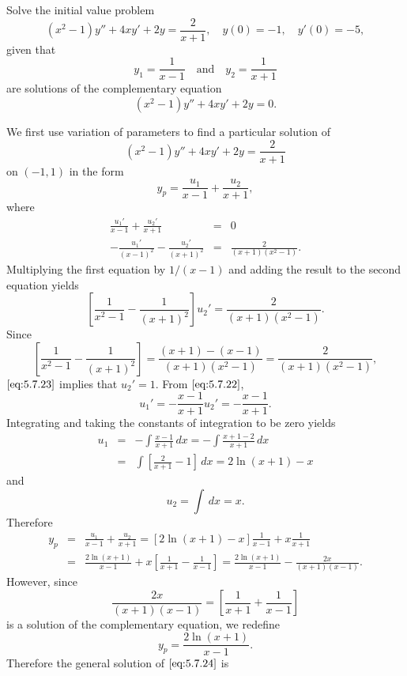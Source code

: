 \documentclass{ximera}
\begin{document}
 
\begin{example}\label{example:5.7.4}
Solve the initial value problem
\begin{equation} \label{eq:5.7.21}
(x^2-1)y''+4xy'+2y=\frac{2}{x+1}, \quad  y(0)=-1,\quad y'(0)=-5,
\end{equation}
 given that
$$
y_1=\frac{1}{x-1}\quad\mbox{and}\quad y_2=\frac{1}{x+1}
$$
are  solutions of the complementary
equation
$$
(x^2-1)y''+4xy'+2y=0.
$$
 
 
\begin{explanation}
We first use variation of parameters to find a particular solution
of
$$
(x^2-1)y''+4xy'+2y=\frac{2}{x+1}
$$
on $(-1,1)$ in the form
$$
y_p=\frac{u_1}{x-1}+\frac{u_2}{x+1},
$$
where
\begin{eqnarray}
\frac{u_1'}{x-1}+\frac{u_2'}{x+1}&=&0\label{eq:5.7.22}\\
-\frac{u_1'}{(x-1)^2}-\frac{u_2'}{(x+1)^2}&=&\frac{2}{(x+1)(x^2-1)}.\nonumber
\end{eqnarray}
Multiplying the first equation by $1/(x-1)$ and adding the result to
the second equation yields
\begin{equation} \label{eq:5.7.23}
\left[\frac{1}{x^2-1}-\frac{1}{(x+1)^2}\right]u_2'=\frac{2}{(x+1)(x^2-1)}.
\end{equation}
Since
$$
\left[\frac{1}{x^2-1}-\frac{1}{(x+1)^2}\right]=\frac{(x+1)-(x-1)}{(x+1)(x^2-1)}
=\frac{2}{(x+1)(x^2-1)},
$$
$\eqref{eq:5.7.23}$ implies that $u_2'=1$. From $\eqref{eq:5.7.22}$,
$$
u_1'=-\frac{x-1}{x+1}u_2'=-\frac{x-1}{x+1}.
$$
Integrating and taking the constants of integration to be zero yields
\begin{eqnarray*}
u_1&=&-\int\frac{x-1}{x+1}\,dx=-\int\frac{x+1-2}{x+1}\,dx \\
&=&\int\left[\frac{2}{x+1}-1\right]\,dx=2\ln(x+1)-x
\end{eqnarray*}
and
$$
u_2=\int\,dx=x.
$$
Therefore
\begin{eqnarray*}
y_p&=&\frac{u_1}{x-1}+\frac{u_2}{x+1}=\left[2\ln(x+1)-x\right]\frac{1}{x-1}
+x\frac{1}{x+1} \\
&=&\frac{2\ln(x+1)}{x-1}+x\left[\frac{1}{x+1}-\frac{1}{x-1}\right]
=\frac{2\ln(x+1)}{x-1}-\frac{2x}{(x+1)(x-1)}.
\end{eqnarray*}
However, since
$$
\frac{2x}{(x+1)(x-1)}=\left[\frac{1}{x+1}+\frac{1}{x-1}\right]
$$
is a solution of the complementary equation, we redefine
$$
y_p=\frac{2\ln(x+1)}{x-1}.
$$
Therefore  the general solution of  $\eqref{eq:5.7.24}$ is
\begin{equation} \label{eq:5.7.24}

\end{equation}
\end{explanation}
\end{example}
\end{document}
